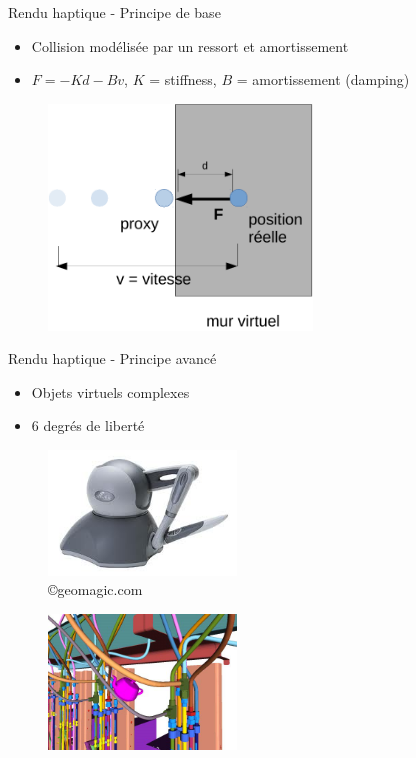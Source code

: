 \documentclass[compress, noflama]{beamer}
\begin{document}
\begin{frame}{Rendu haptique - Principe de base}
\begin{itemize}
\item Collision modélisée par un ressort et amortissement
\item $F = -Kd - Bv$, $K$ = stiffness, $B$ = amortissement (damping)
\end{itemize}
\begin{figure}
\centering
\includegraphics[width=7cm]{images/hapticRendering3}{}
\end{figure}
\end{frame}

\begin{frame}{Rendu haptique - Principe avancé}
\begin{itemize}
\item Objets virtuels complexes
\item 6 degrés de liberté
\end{itemize}
\begin{multicols}{2}
\begin{figure}
\centering
\includegraphics[width=5cm]{images/phantom}
\vspace{0.25cm}
\caption{\copyright geomagic.com}
\end{figure}
\begin{figure}
\centering
\includegraphics[width=5cm]{images/hapticRenderingExample}
\caption{\cite{McNeely2005}}
\end{figure}
\end{multicols}
\end{frame}
\end{document}
